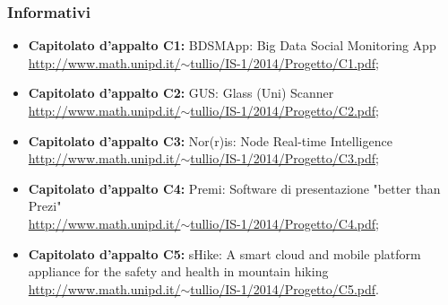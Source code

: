 \subsubsection{Informativi}
\begin{itemize}
	\item \textbf{Capitolato d’appalto C1:} BDSMApp: Big Data Social Monitoring App \href{http://www.math.unipd.it/~tullio/IS-1/2014/Progetto/C1.pdf}{http://www.math.unipd.it/$\sim$tullio/IS-1/2014/Progetto/C1.pdf};
	\item \textbf{ Capitolato d’appalto C2:} GUS: Glass (Uni) Scanner\\ \href{http://www.math.unipd.it/~tullio/IS-1/2014/Progetto/C2.pdf}{http://www.math.unipd.it/$\sim$tullio/IS-1/2014/Progetto/C2.pdf};
	\item \textbf{ Capitolato d’appalto C3:}  Nor(r)is: Node Real-time Intelligence \\ \href{http://www.math.unipd.it/~tullio/IS-1/2014/Progetto/C3.pdf}{http://www.math.unipd.it/$\sim$tullio/IS-1/2014/Progetto/C3.pdf};
	\item \textbf{ Capitolato d’appalto C4:} Premi: Software di presentazione "better than Prezi"\\ \href{http://www.math.unipd.it/~tullio/IS-1/2014/Progetto/C4.pdf}{http://www.math.unipd.it/$\sim$tullio/IS-1/2014/Progetto/C4.pdf};
	\item \textbf{ Capitolato d’appalto C5:} 
	sHike: A smart cloud and mobile platform appliance for the safety and health in mountain hiking\\ \href{http://www.math.unipd.it/~tullio/IS-1/2014/Progetto/C5.pdf}{http://www.math.unipd.it/$\sim$tullio/IS-1/2014/Progetto/C5.pdf}.
\end{itemize}